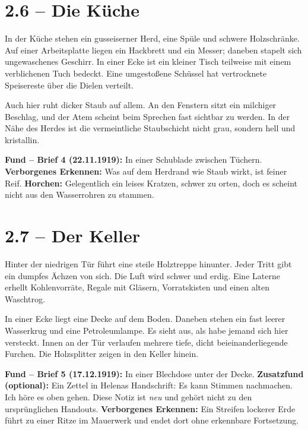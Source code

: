 \section{2.6 -- Die Küche}
\begin{vorlesetextalle}
In der Küche stehen ein gusseiserner Herd, eine Spüle und schwere Holzschränke. Auf einer Arbeitsplatte liegen ein Hackbrett und ein Messer; daneben stapelt sich ungewaschenes Geschirr. In einer Ecke ist ein kleiner Tisch teilweise mit einem verblichenen Tuch bedeckt. Eine umgesto\ss{}ene Schüssel hat vertrocknete Speisereste über die Dielen verteilt.

Auch hier ruht dicker Staub auf allem. An den Fenstern sitzt ein milchiger Beschlag, und der Atem scheint beim Sprechen fast sichtbar zu werden. In der Nähe des Herdes ist die vermeintliche Staubschicht nicht grau, sondern hell und kristallin.
\end{vorlesetextalle}
\begin{meisterinfo}
\textbf{Fund -- Brief 4 (22.11.1919):} In einer Schublade zwischen Tüchern. \textbf{Verborgenes Erkennen:} Was auf dem Herdrand wie Staub wirkt, ist feiner Reif. \textbf{Horchen:} Gelegentlich ein leises Kratzen, schwer zu orten, doch es scheint nicht aus den Wasserrohren zu stammen.
\end{meisterinfo}

\section{2.7 -- Der Keller}
\begin{vorlesetextalle}
Hinter der niedrigen Tür führt eine steile Holztreppe hinunter. Jeder Tritt gibt ein dumpfes Ächzen von sich. Die Luft wird schwer und erdig. Eine Laterne erhellt Kohlenvorräte, Regale mit Gläsern, Vorratskisten und einen alten Waschtrog.

In einer Ecke liegt eine Decke auf dem Boden. Daneben stehen ein fast leerer Wasserkrug und eine Petroleumlampe. Es sieht aus, als habe jemand sich hier versteckt. Innen an der Tür verlaufen mehrere tiefe, dicht beieinanderliegende Furchen. Die Holzsplitter zeigen in den Keller hinein.
\end{vorlesetextalle}
\begin{meisterinfo}
\textbf{Fund -- Brief 5 (17.12.1919):} In einer Blechdose unter der Decke. \textbf{Zusatzfund (optional):} Ein Zettel in Helenas Handschrift: \glqq{}Es kann Stimmen nachmachen. Ich höre es oben gehen.\grqq{} Diese Notiz ist \emph{neu} und gehört nicht zu den ursprünglichen Handouts. \textbf{Verborgenes Erkennen:} Ein Streifen lockerer Erde führt zu einer Ritze im Mauerwerk und endet dort ohne erkennbare Fortsetzung.
\end{meisterinfo}

